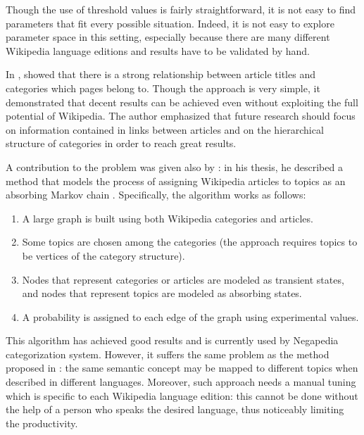         Though the use of threshold values is fairly straightforward, it is not easy to find parameters that fit every possible situation. Indeed, it is not easy to explore parameter space in this setting, especially because there are many different Wikipedia language editions and results have to be validated by hand.
        
        In \cite{Schonhofen}, \citeauthor{Schonhofen} showed that there is a strong relationship between article titles and categories which pages belong to. Though the approach is very simple, it demonstrated that decent results can be achieved even without exploiting the full potential of Wikipedia. The author emphasized that future research should focus on information contained in links between articles and on the hierarchical structure of categories in order to reach great results.
        
        A contribution to the problem was given also by \citeauthor{Bonetti}: in his thesis, he described a method that models the process of assigning Wikipedia articles to topics as an absorbing Markov chain \cite{Bonetti}. Specifically, the algorithm works as follows:
        \begin{enumerate}
            \item A large graph is built using both Wikipedia categories and articles.
            \item Some topics are chosen among the categories (the approach requires topics to be vertices of the category structure).
            \item Nodes that represent categories or articles are modeled as transient states, and nodes that represent topics are modeled as absorbing states.
            \item A probability is assigned to each edge of the graph using experimental values.
        \end{enumerate}
        
        This algorithm has achieved good results and is currently used by Negapedia categorization system. However, it suffers the same problem as the method proposed in \cite{Kittur}: the same semantic concept may be mapped to different topics when described in different languages. Moreover, such approach needs a manual tuning which is specific to each Wikipedia language edition: this cannot be done without the help of a person who speaks the desired language, thus noticeably limiting the productivity.
